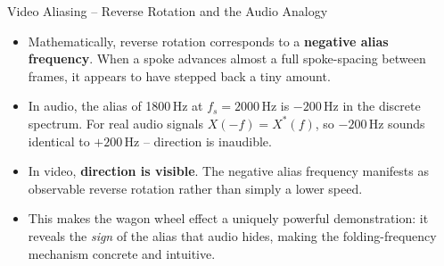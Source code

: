 \documentclass[aspectratio=169]{beamer}
\begin{document}
\begin{frame}{Video Aliasing -- Reverse Rotation and the Audio Analogy}
  \begin{itemize}
    \item Mathematically, reverse rotation corresponds to a \textbf{negative alias frequency}. When a spoke advances almost a full spoke-spacing between frames, it appears to have stepped back a tiny amount.
    \item In audio, the alias of 1800\,Hz at $f_s=2000$\,Hz is $-200$\,Hz in the discrete spectrum. For real audio signals $X(-f)=X^*(f)$, so $-200$\,Hz sounds identical to $+200$\,Hz -- direction is inaudible.
    \item In video, \textbf{direction is visible}. The negative alias frequency manifests as observable reverse rotation rather than simply a lower speed.
    \item This makes the wagon wheel effect a uniquely powerful demonstration: it reveals the \emph{sign} of the alias that audio hides, making the folding-frequency mechanism concrete and intuitive.
  \end{itemize}
\end{frame}
\end{document}
